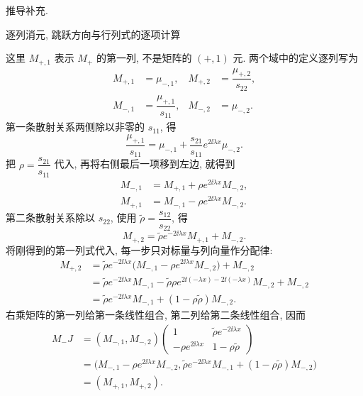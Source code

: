 \par\medskip\noindent 推导补充.\par
\par\medskip\noindent 逐列消元, 跳跃方向与行列式的逐项计算\par
这里 $M_{+,1}$ 表示 $M_+$ 的第一列, 不是矩阵的 $(+,1)$ 元.
两个域中的定义逐列写为
\begin{equation*}
\begin{aligned}
M_{+,1}&=\mu_{-,1},&
M_{+,2}&=\dfrac{\mu_{+,2}}{s_{22}},\\
M_{-,1}&=\dfrac{\mu_{+,1}}{s_{11}},&
M_{-,2}&=\mu_{-,2}.
\end{aligned}
\end{equation*}
第一条散射关系两侧除以非零的 $s_{11}$, 得
\begin{equation*}
\dfrac{\mu_{+,1}}{s_{11}}
=\mu_{-,1}
+\dfrac{s_{21}}{s_{11}}e^{2\ii\lambda x}\mu_{-,2}.
\end{equation*}
把 $\rho=\dfrac{s_{21}}{s_{11}}$ 代入, 再将右侧最后一项移到左边, 就得到
\begin{equation*}
\begin{aligned}
M_{-,1}
&=M_{+,1}+\rho e^{2\ii\lambda x}M_{-,2},\\
M_{+,1}
&=M_{-,1}-\rho e^{2\ii\lambda x}M_{-,2}.
\end{aligned}
\end{equation*}
第二条散射关系除以 $s_{22}$, 使用 $\widetilde\rho=\dfrac{s_{12}}{s_{22}}$, 得
\begin{equation*}
M_{+,2}
=\widetilde\rho e^{-2\ii\lambda x}M_{+,1}+M_{-,2}.
\end{equation*}
将刚得到的第一列式代入, 每一步只对标量与列向量作分配律:
\begin{equation*}
\begin{aligned}
M_{+,2}
&=\widetilde\rho e^{-2\ii\lambda x}
\bigl(M_{-,1}-\rho e^{2\ii\lambda x}M_{-,2}\bigr)
+M_{-,2}\\
&=\widetilde\rho e^{-2\ii\lambda x}M_{-,1}
-\widetilde\rho\rho e^{2\ii(-\lambda x)-2\ii(-\lambda x)}M_{-,2}
+M_{-,2}\\
&=\widetilde\rho e^{-2\ii\lambda x}M_{-,1}
+(1-\rho\widetilde\rho)M_{-,2}.
\end{aligned}
\end{equation*}
右乘矩阵的第一列给第一条线性组合, 第二列给第二条线性组合, 因而
\begin{equation*}
\begin{aligned}
M_-J
&=(M_{-,1},M_{-,2})
\begin{pmatrix}
1&\widetilde\rho e^{-2\ii\lambda x}\\
-\rho e^{2\ii\lambda x}&1-\rho\widetilde\rho
\end{pmatrix}\\
&=\bigl(
M_{-,1}-\rho e^{2\ii\lambda x}M_{-,2},
\widetilde\rho e^{-2\ii\lambda x}M_{-,1}
+(1-\rho\widetilde\rho)M_{-,2}
\bigr)\\
&=(M_{+,1},M_{+,2}).
\end{aligned}
\end{equation*}
